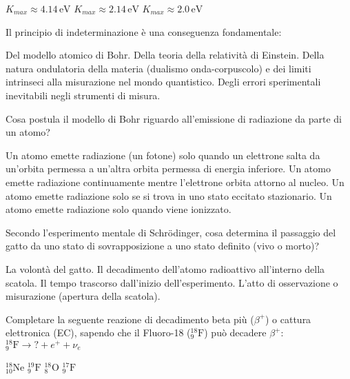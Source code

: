 \documentclass{exam}%
\begin{document}
\begin{questions}
\begin{multicols}{4}
\begin{choices}
\choice $K_{max} \approx 4.14 \, \text{eV}$%
\choice $K_{max} \approx 2.14 \, \text{eV}$%
\choice $K_{max} \approx 2.0 \, \text{eV}$%
\end{choices}%
\end{multicols}%
\question Il principio di indeterminazione è una conseguenza fondamentale:%
\vspace{0.2em}%
\begin{choices}%
\choice Del modello atomico di Bohr.%
\choice Della teoria della relatività di Einstein.%
\choice Della natura ondulatoria della materia (dualismo onda-corpuscolo) e dei limiti intrinseci alla misurazione nel mondo quantistico.%
\choice Degli errori sperimentali inevitabili negli strumenti di misura.%
\end{choices}%
\question Cosa postula il modello di Bohr riguardo all'emissione di radiazione da parte di un atomo?%
\vspace{0.2em}%
\begin{choices}%
\choice Un atomo emette radiazione (un fotone) solo quando un elettrone salta da un'orbita permessa a un'altra orbita permessa di energia inferiore.%
\choice Un atomo emette radiazione continuamente mentre l'elettrone orbita attorno al nucleo.%
\choice Un atomo emette radiazione solo se si trova in uno stato eccitato stazionario.%
\choice Un atomo emette radiazione solo quando viene ionizzato.%
\end{choices}%
\question Secondo l'esperimento mentale di Schrödinger, cosa determina il passaggio del gatto da uno stato di sovrapposizione a uno stato definito (vivo o morto)?%
\vspace{0.2em}%
\begin{choices}%
\choice La volontà del gatto.%
\choice Il decadimento dell'atomo radioattivo all'interno della scatola.%
\choice Il tempo trascorso dall'inizio dell'esperimento.%
\choice L'atto di osservazione o misurazione (apertura della scatola).%
\end{choices}%
\question Completare la seguente reazione di decadimento beta più ($\beta^+$) o cattura elettronica (EC), sapendo che il Fluoro-18 ($^{18}_{9}\text{F}$) può decadere $\beta^+$: $^{18}_{9}\text{F} \rightarrow ? + e^+ + \nu_e$%
\vspace{0.2em}%
\begin{multicols}{4}%
\begin{choices}%
\choice $^{18}_{10}\text{Ne}$%
\choice $^{19}_{9}\text{F}$%
\choice $^{18}_{8}\text{O}$%
\choice $^{17}_{9}\text{F}$%
\end{choices}%

\end{multicols}
\end{questions}
\end{document}
